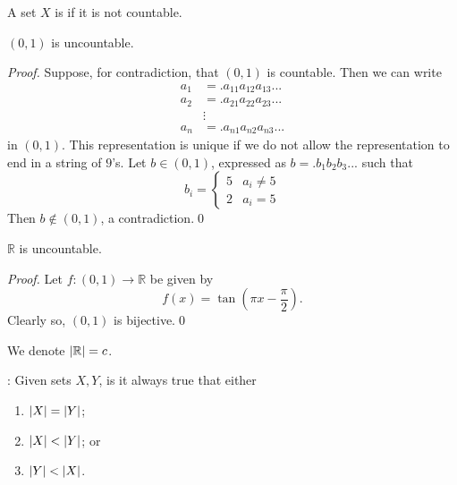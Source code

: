 \documentclass[notoc,notitlepage]{tufte-book}
\begin{document}
\begin{defn}[Uncountable]
\label{defn:uncountable}
  A set $X$ is  if it is not countable.
\end{defn}

\begin{thm}
\label{thm:cantor_s_diagonal_argument}
  $(0, 1)$ is uncountable.
\end{thm}

\begin{proof}
  Suppose, for contradiction, that $(0, 1)$ is countable. Then we can write
  \begin{align*}
    a_1 &= .a_{11} a_{12} a_{13} ... \\
    a_2 &= .a_{21} a_{22} a_{23} ... \\
        &\vdots \\
    a_n &= .a_{n1} a_{n2} a_{n3} ...
  \end{align*}
  in $(0, 1)$. This representation is unique if we do not allow the representation to end in a string of $9$'s. Let $b \in (0, 1)$, expressed as $b = . b_1 b_2 b_3 ...$ such that
  \begin{equation*}
    b_i = \begin{cases}
      5 & a_i \neq 5 \\
      2 & a_i = 5
    \end{cases}
  \end{equation*}
  Then $b \notin (0, 1)$, a contradiction.\qed
\end{proof}

\begin{crly}
\label{crly:uncountability_of_r}
  $\mathbb{R}$ is uncountable.
\end{crly}

\begin{proof}
  Let $f : (0, 1) \to \mathbb{R}$ be given by
  \begin{equation*}
    f(x) = \tan \left( \pi x - \frac{\pi}{2} \right).
  \end{equation*}
  Clearly so, $(0, 1)$ is bijective.\qed
\end{proof}

\begin{note}
  We denote $\left|\mathbb{R}\right| = c$.
\end{note}

: Given sets $X, Y$, is it always true that either
\begin{enumerate}
  \item $\left|X\right| = \left|Y\right|$;
  \item $\left|X\right| < \left|Y\right|$; or
  \item $\left|Y\right| < \left|X\right|$.
\end{enumerate}



\appendix

\backmatter

\pagestyle{plain}

\nobibliography*


\printindex
\end{document}
